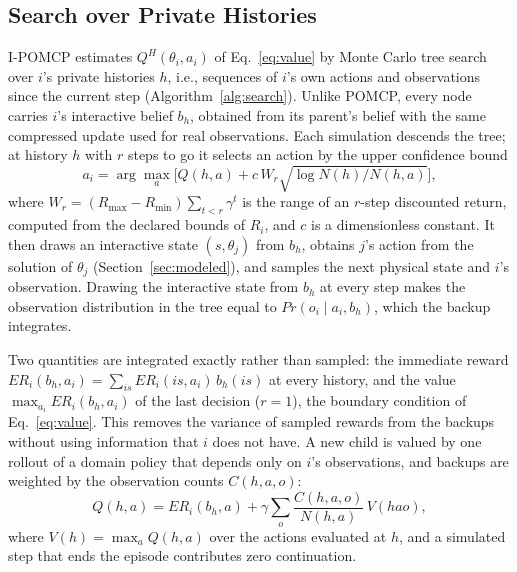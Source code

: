\documentclass{article}
\newcommand{\ER}{\mathit{ER}}
\renewcommand{\Pr}{\mathit{Pr}}
\begin{document}
\subsection{Search over Private Histories}
\label{sec:search}

I-POMCP estimates $Q^H(\theta_i, a_i)$ of Eq.~\ref{eq:value} by Monte Carlo tree search \cite{kocsis2006bandit,silver2010monte} over $i$'s private histories $h$, i.e., sequences of $i$'s own actions and observations since the current step (Algorithm~\ref{alg:search}). Unlike POMCP, every node carries $i$'s interactive belief $b_h$, obtained from its parent's belief with the same compressed update used for real observations. Each simulation descends the tree; at history $h$ with $r$ steps to go it selects an action by the upper confidence bound
\begin{equation}
a_i = \arg\max_{a} \Big[ Q(h, a) + c\, W_r \sqrt{\log N(h) / N(h, a)} \Big],
\label{eq:ucb}
\end{equation}
where $W_r = (R_{\max} - R_{\min}) \sum_{t < r} \gamma^t$ is the range of an $r$-step discounted return, computed from the declared bounds of $R_i$, and $c$ is a dimensionless constant. It then draws an interactive state $(s, \theta_j)$ from $b_h$, obtains $j$'s action from the solution of $\theta_j$ (Section~\ref{sec:modeled}), and samples the next physical state and $i$'s observation. Drawing the interactive state from $b_h$ at every step makes the observation distribution in the tree equal to $\Pr(o_i \mid a_i, b_h)$, which the backup integrates.

Two quantities are integrated exactly rather than sampled: the immediate reward $\ER_i(b_h, a_i) = \sum_{is} \ER_i(is, a_i)\, b_h(is)$ at every history, and the value $\max_{a_i} \ER_i(b_h, a_i)$ of the last decision ($r = 1$), the boundary condition of Eq.~\ref{eq:value}. This removes the variance of sampled rewards from the backups without using information that $i$ does not have. A new child is valued by one rollout of a domain policy that depends only on $i$'s observations, and backups are weighted by the observation counts $C(h, a, o)$:
\begin{equation}
Q(h, a) = \ER_i(b_h, a) + \gamma \sum_{o} \frac{C(h, a, o)}{N(h, a)}\, V(h a o),
\label{eq:backup}
\end{equation}
where $V(h) = \max_a Q(h, a)$ over the actions evaluated at $h$, and a simulated step that ends the episode contributes zero continuation.
\end{document}
